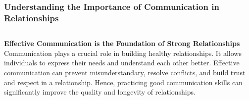 \documentclass[5pt]{beamer}
\begin{document}
\begin{frame}
\frametitle{Understanding the Importance of Communication in Relationships}
\begin{columns}
\begin{column}{0.7\textwidth}
\begin{block}{\textbf{Effective Communication is the Foundation of Strong Relationships}}
Communication plays a crucial role in building healthy relationships. It allows individuals to express their needs and understand each other better. Effective communication can prevent misunderstandary, resolve conflicts, and build trust and respect in a relationship. Hence, practicing good communication skills can significantly improve the quality and longevity of relationships.
\end{block}
\end{column}
\end{columns}
\end{frame}
\end{document}

